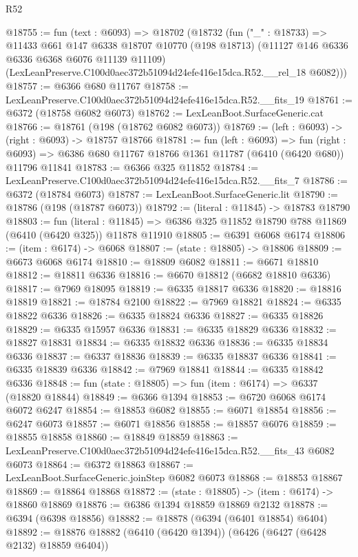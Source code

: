 \begin{lexlean}{R52}
\begin{coremodule}
@18755 := fun (text : @6093) =>
  @18702
    (@18732
      (fun ("_" : @18733) =>
      @11433
        @661
        @147
        @6338
        @18707
        @10770
        (@198 @18713)
        (@11127 @146 @6336 @6336 @6368 @6076 @11139 @11109)
        (LexLeanPreserve.C100d0aec372b51094d24efe416e15dca.R52.__rel_18 @6082)))
@18757 := @6366 @680 @11767
@18758 := LexLeanPreserve.C100d0aec372b51094d24efe416e15dca.R52.__fits_19
@18761 := @6372 (@18758 @6082 @6073)
@18762 := LexLeanBoot.SurfaceGeneric.cat
@18766 := @18761 (@198 (@18762 @6082 @6073))
@18769 := (left : @6093) -> (right : @6093) -> @18757 @18766
@18781 := fun (left : @6093) =>
  fun (right : @6093) => @6386 @680 @11767 @18766 @1361 @11787 (@6410 (@6420 @680)) @11796 @11841
@18783 := @6366 @325 @11852
@18784 := LexLeanPreserve.C100d0aec372b51094d24efe416e15dca.R52.__fits_7
@18786 := @6372 (@18784 @6073)
@18787 := LexLeanBoot.SurfaceGeneric.lit
@18790 := @18786 (@198 (@18787 @6073))
@18792 := (literal : @11845) -> @18783 @18790
@18803 := fun (literal : @11845) =>
  @6386 @325 @11852 @18790 @788 @11869 (@6410 (@6420 @325)) @11878 @11910
@18805 := @6391 @6068 @6174
@18806 := (item : @6174) -> @6068
@18807 := (state : @18805) -> @18806
@18809 := @6673 @6068 @6174
@18810 := @18809 @6082
@18811 := @6671 @18810
@18812 := @18811 @6336
@18816 := @6670 @18812 (@6682 @18810 @6336)
@18817 := @7969 @18095
@18819 := @6335 @18817 @6336
@18820 := @18816 @18819
@18821 := @18784 @2100
@18822 := @7969 @18821
@18824 := @6335 @18822 @6336
@18826 := @6335 @18824 @6336
@18827 := @6335 @18826
@18829 := @6335 @15957 @6336
@18831 := @6335 @18829 @6336
@18832 := @18827 @18831
@18834 := @6335 @18832 @6336
@18836 := @6335 @18834 @6336
@18837 := @6337 @18836
@18839 := @6335 @18837 @6336
@18841 := @6335 @18839 @6336
@18842 := @7969 @18841
@18844 := @6335 @18842 @6336
@18848 := fun (state : @18805) => fun (item : @6174) => @6337 (@18820 @18844)
@18849 := @6366 @1394
@18853 := @6720 @6068 @6174 @6072 @6247
@18854 := @18853 @6082
@18855 := @6071 @18854
@18856 := @6247 @6073
@18857 := @6071 @18856
@18858 := @18857 @6076
@18859 := @18855 @18858
@18860 := @18849 @18859
@18863 := LexLeanPreserve.C100d0aec372b51094d24efe416e15dca.R52.__fits_43 @6082 @6073
@18864 := @6372 @18863
@18867 := LexLeanBoot.SurfaceGeneric.joinStep @6082 @6073
@18868 := @18853 @18867
@18869 := @18864 @18868
@18872 := (state : @18805) -> (item : @6174) -> @18860 @18869
@18876 := @6386 @1394 @18859 @18869 @2132
@18878 := @6394 (@6398 @18856)
@18882 := @18878 (@6394 (@6401 @18854) @6404)
@18892 := @18876 @18882 (@6410 (@6420 @1394)) (@6426 (@6427 (@6428 @2132) @18859 @6404))

\end{coremodule}
\end{lexlean}
